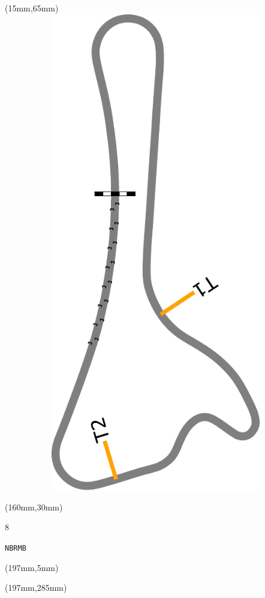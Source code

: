 \begin{textblock*}{185mm}(15mm,65mm)%
\centering
\mbox{\includegraphics[width=185mm,height=210mm,keepaspectratio]{PT/NBRMB.pdf}}
\end{textblock*}
\begin{textblock*}{40mm}(160mm,30mm)%
\Large
\par{} 
\par8 
\par\hfill\tiny\tt NBRMB\\
\end{textblock*}
\begin{textblock*}{20mm}(197mm,5mm)%
\fbox{\thepage}
\label{NBRMB}
\end{textblock*}
\begin{textblock*}{20mm}(197mm,285mm)%
\fbox{\thepage}
\end{textblock*}

